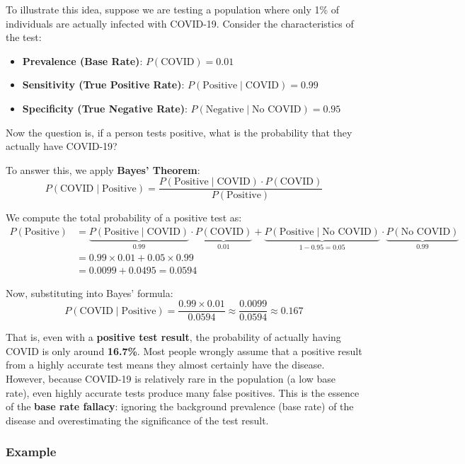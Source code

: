 \documentclass[twoside]{book}
\begin{document}
To illustrate this idea, suppose we are testing a population where only 1\% of individuals are actually infected with COVID-19. Consider the characteristics of the test:

\begin{itemize}
    \item \textbf{Prevalence (Base Rate)}: $P(\text{COVID}) = 0.01$
    \item \textbf{Sensitivity (True Positive Rate)}: $P(\text{Positive} \mid \text{COVID}) = 0.99$
    \item \textbf{Specificity (True Negative Rate)}: $P(\text{Negative} \mid \text{No COVID}) = 0.95$
\end{itemize}

Now the question is, if a person tests positive, what is the probability that they actually have COVID-19?


To answer this, we apply \textbf{Bayes’ Theorem}:
\[
P(\text{COVID} \mid \text{Positive}) = \frac{P(\text{Positive} \mid \text{COVID}) \cdot P(\text{COVID})}{P(\text{Positive})}
\]

We compute the total probability of a positive test as:
\begin{align*}
P(\text{Positive}) &= \underbrace{P(\text{Positive} \mid \text{COVID})}_{0.99} \cdot \underbrace{P(\text{COVID})}_{0.01} + \underbrace{P(\text{Positive} \mid \text{No COVID})}_{1-0.95 = 0.05} \cdot \underbrace{P(\text{No COVID})}_{0.99}\\
&= 0.99\times 0.01 + 0.05 \times 0.99 \\
&= 0.0099 + 0.0495 = 0.0594
\end{align*}

Now, substituting into Bayes' formula:
\[
P(\text{COVID} \mid \text{Positive}) = \frac{0.99 \times 0.01}{0.0594} \approx \frac{0.0099}{0.0594} \approx 0.167
\]

That is, even with a \textbf{positive test result}, the probability of actually having COVID is only around \textbf{16.7\%}. Most people wrongly assume that a positive result from a highly accurate test means they almost certainly have the disease. However, because COVID-19 is relatively rare in the population (a low base rate), even highly accurate tests produce many false positives. This is the essence of the \textbf{base rate fallacy}: ignoring the background prevalence (base rate) of the disease and overestimating the significance of the test result.

\subsubsection{Example}
\end{document}
